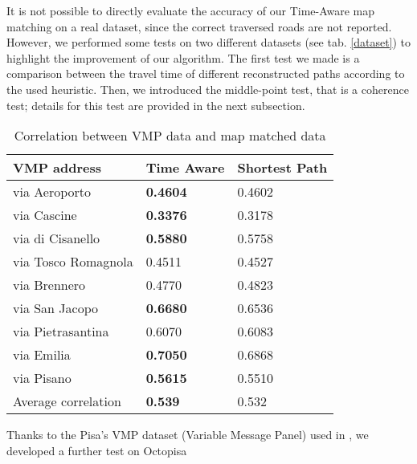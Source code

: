 \documentclass[5p]{elsarticle}
\begin{document}
It is not possible to directly evaluate the accuracy of our Time-Aware map matching on a real dataset, since the correct traversed roads are not reported.
However, we performed some tests on two different datasets (see tab. \ref{dataset}) to highlight the improvement of 
our algorithm. The first test we made is a comparison between the travel time of different reconstructed paths according to the used heuristic.
Then, we introduced the middle-point test, that is a coherence test; details for this test 
are provided in the next subsection. 
\begin{table}[bh]
\begin{tabular}{|l|p{2cm}|p{2cm}|}
\hline
\textbf{VMP address} & \textbf{Time Aware}  & \textbf{Shortest Path} \\ \hline
via Aeroporto        & \textbf{0.4604}                          & 0.4602                             \\ \hline
via Cascine          & \textbf{0.3376}                          & 0.3178                             \\ \hline
via di Cisanello     & \textbf{0.5880}                          & 0.5758                             \\ \hline
via Tosco Romagnola  & 0.4511                          & 0.4527                             \\ \hline
via Brennero         & 0.4770                          & 0.4823                             \\ \hline
via San Jacopo       & \textbf{0.6680}                          & 0.6536                             \\ \hline
via Pietrasantina    & 0.6070                          & 0.6083                             \\ \hline
via Emilia           & \textbf{0.7050}                          & 0.6868                             \\ \hline
via Pisano           & \textbf{0.5615}                          & 0.5510                             \\ \hline
Average correlation & \textbf{0.539}                           & 0.532                      \\ \hline


\end{tabular}
\caption{Correlation between VMP data and map matched data}
\label{pmv-corr}
\end{table}
Thanks to the Pisa's VMP dataset (Variable Message Panel) used in \cite{pappalardo2013understanding}, we developed a further test on Octopisa
\end{document}
